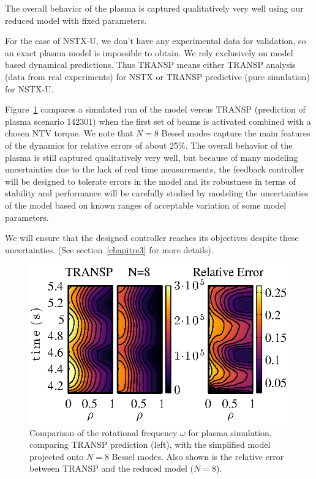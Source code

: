 \documentclass[12pt,lot, lof]{puthesis}
\begin{document}
The overall behavior of the plasma is captured qualitatively very well using our reduced model with fixed parameters.

For the case of NSTX-U, we don't have any experimental data for validation, so an exact plasma model is impossible to obtain. We rely exclusively on model based dynamical predictions. Thus TRANSP means either TRANSP analysis (data from real experiments) for NSTX or TRANSP predictive (pure simulation) for NSTX-U.

 Figure~\ref{heho2} compares a simulated run of the model versus TRANSP (prediction of plasma scenario 142301) when the first set of beams is activated combined with a chosen NTV torque.
We note that $N = 8$ Bessel modes capture the main features of the dynamics for relative errors of about 25\%.
The overall behavior of the plasma is still captured qualitatively very well, but because of many modeling uncertainties due to the lack of real time measurements, the feedback controller will be designed to tolerate errors in the model and its robustness in terms of stability and performance will be carefully studied by modeling the uncertainties of the model based on known ranges of acceptable variation of some model parameters.

We will ensure that the designed controller reaches its objectives despite these uncertainties. (See section~{\ref{chapitre3}} for more details). 

\begin{figure}[htbp]
\centering
\includegraphics [width=0.8 \linewidth]{chap10/fig10} 
\caption{Comparison of the rotational frequency $\omega$ for plasma simulation, comparing TRANSP prediction (left), with the simplified model projected onto $N=8$ Bessel modes.  Also shown is the relative error between TRANSP and the reduced model ($N=8$).}
\label{heho2}
\end{figure}
\end{document}

